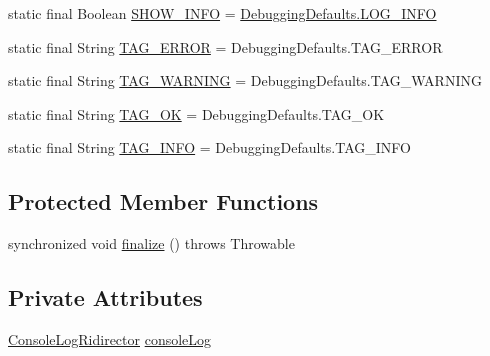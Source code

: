 \begin{DoxyCompactItemize}
\item 
static final Boolean \hyperlink{classit_1_1emarolab_1_1cagg_1_1debugging_1_1StandaloneDebuggingText_a3d21db1e937e43fb3089bba1184387b4}{S\-H\-O\-W\-\_\-\-I\-N\-F\-O} = \hyperlink{classit_1_1emarolab_1_1cagg_1_1debugging_1_1DebuggingDefaults_a029fcf850c3dd1c1aed7c8bc0620ed8a}{Debugging\-Defaults.\-L\-O\-G\-\_\-\-I\-N\-F\-O}
\item 
static final String \hyperlink{classit_1_1emarolab_1_1cagg_1_1debugging_1_1StandaloneDebuggingText_a87228d13eb7f2bde2398b75b01d61aec}{T\-A\-G\-\_\-\-E\-R\-R\-O\-R} = Debugging\-Defaults.\-T\-A\-G\-\_\-\-E\-R\-R\-O\-R
\item 
static final String \hyperlink{classit_1_1emarolab_1_1cagg_1_1debugging_1_1StandaloneDebuggingText_a52718612ef346374592fba3ac72bb0be}{T\-A\-G\-\_\-\-W\-A\-R\-N\-I\-N\-G} = Debugging\-Defaults.\-T\-A\-G\-\_\-\-W\-A\-R\-N\-I\-N\-G
\item 
static final String \hyperlink{classit_1_1emarolab_1_1cagg_1_1debugging_1_1StandaloneDebuggingText_a8a3a3ed3e65988710e063e64509fa678}{T\-A\-G\-\_\-\-O\-K} = Debugging\-Defaults.\-T\-A\-G\-\_\-\-O\-K
\item 
static final String \hyperlink{classit_1_1emarolab_1_1cagg_1_1debugging_1_1StandaloneDebuggingText_a09a44bdbeff02bfca0dca16f72a7f520}{T\-A\-G\-\_\-\-I\-N\-F\-O} = Debugging\-Defaults.\-T\-A\-G\-\_\-\-I\-N\-F\-O
\end{DoxyCompactItemize}
\subsection*{Protected Member Functions}
\begin{DoxyCompactItemize}
\item 
synchronized void \hyperlink{classit_1_1emarolab_1_1cagg_1_1debugging_1_1StandaloneDebuggingText_ab3616979b3e68503400ddc091a227499}{finalize} ()  throws Throwable 
\end{DoxyCompactItemize}
\subsection*{Private Attributes}
\begin{DoxyCompactItemize}
\item 
\hyperlink{classit_1_1emarolab_1_1cagg_1_1debugging_1_1StandaloneDebuggingText_1_1ConsoleLogRidirector}{Console\-Log\-Ridirector} \hyperlink{classit_1_1emarolab_1_1cagg_1_1debugging_1_1StandaloneDebuggingText_a10b29a352e383e5d6c592a74649c25c9}{console\-Log}
\end{DoxyCompactItemize}
